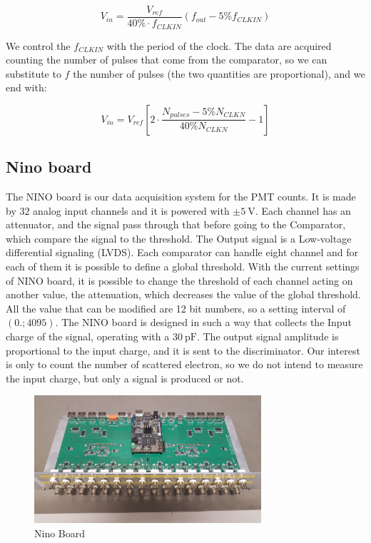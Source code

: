 \begin{equation}
V_{in} = \frac{V_{ref}}{40 \% \cdot f_{CLKIN}} (f_{out} - 5\% f_{CLKIN})
\end{equation}

We control the $f_{CLKIN}$ with the period of the clock. The data are acquired counting the number of pulses that come from the comparator, so we can substitute to $f$ the number of pulses (the two quantities are proportional), and we end with:

\begin{equation} \label{eq:Vfc}
V_{in} =  V_{ref}[2 \cdot \dfrac{N_{pulses} - 5 \% N_{CLKN}}{40 \% N_{CLKN}} - 1]
\end{equation}

\subsection{Nino board} \label{NINO}

The NINO board is our data acquisition system for the PMT counts. It is made by $32$ analog input channels and it is powered with $\pm \SI{5}{\volt}$. Each channel has an attenuator, and the signal pass through that before going to the Comparator, which compare the signal to the threshold. The Output signal is a Low-voltage differential signaling (LVDS). Each comparator can handle eight channel and for each of them it is possible to define a global threshold. With the current settings of NINO board, it is possible to change the threshold of each channel acting on another value, the attenuation, which decreases the value of the global threshold. All the value that can be modified are 12 bit numbers, so a setting interval of $(0. ; 4095)$. \medskip
The NINO board is designed in such a way that collects the Input charge of the signal, operating with a $\SI{30}{\pico \farad}$. The output signal amplitude is proportional to the input charge, and it is sent to the discriminator. Our interest is only to count the number of scattered electron, so we do not intend to measure the input charge, but only a signal is produced or not.

\begin{figure}[hbtp]
\centering
\includegraphics[width = 0.75\textwidth]{ExperimentalSetup/NINO.jpg}
\caption{Nino Board}
\label{fig:NinoBoard}
\end{figure}

